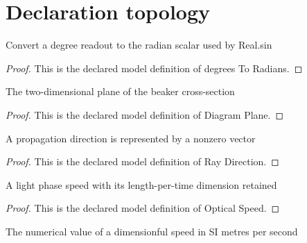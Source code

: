 \section{Declaration topology}
\begin{definition}
  \label{def:physics:phyx-mini-0091:phyxminiproblems-problemphyxmini0091-degreestoradians}
  Convert a degree readout to the radian scalar used by Real.sin
\end{definition}
\begin{proof}
  This is the declared model definition of degrees To Radians.
\end{proof}
\begin{definition}
  \label{def:physics:phyx-mini-0091:phyxminiproblems-problemphyxmini0091-diagramplane}
  The two-dimensional plane of the beaker cross-section
\end{definition}
\begin{proof}
  This is the declared model definition of Diagram Plane.
\end{proof}
\begin{definition}
  \label{def:physics:phyx-mini-0091:phyxminiproblems-problemphyxmini0091-raydirection}
  A propagation direction is represented by a nonzero vector
\end{definition}
\begin{proof}
  This is the declared model definition of Ray Direction.
\end{proof}
\begin{definition}
  \label{def:physics:phyx-mini-0091:phyxminiproblems-problemphyxmini0091-opticalspeed}
  A light phase speed with its length-per-time dimension retained
\end{definition}
\begin{proof}
  This is the declared model definition of Optical Speed.
\end{proof}
\begin{definition}
  \label{def:physics:phyx-mini-0091:phyxminiproblems-problemphyxmini0091-speedinmeterspersecond}
  The numerical value of a dimensionful speed in SI metres per second
\end{definition}
